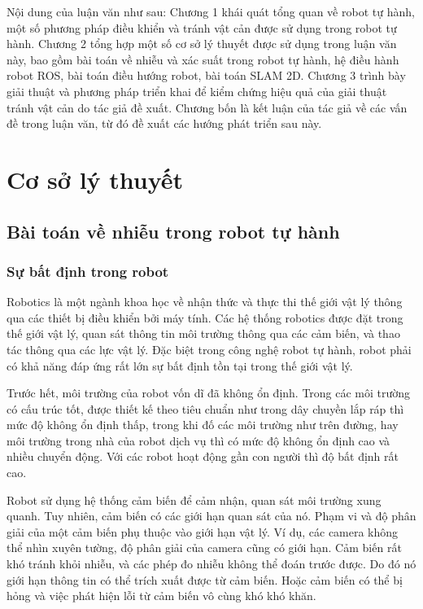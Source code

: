 Nội dung của luận văn như sau: Chương 1 khái quát tổng quan về robot tự hành, một số phương pháp điều khiển và tránh vật cản được sử dụng trong robot tự hành. Chương 2 tổng hợp một số cơ sở lý thuyết được sử dụng trong luận văn này, bao gồm bài toán về nhiễu và xác suất trong robot tự hành, hệ điều hành robot ROS, bài toán điều hướng robot, bài toán SLAM 2D. Chương 3 trình bày giải thuật và phương pháp triển khai để kiểm chứng hiệu quả của giải thuật tránh vật cản do tác giả đề xuất. Chương bốn là kết luận của tác giả về các vấn đề trong luận văn, từ đó đề xuất các hướng phát triển sau này.

\chapter{Cơ sở lý thuyết}
\label{chap:1cslt}
\section{Bài toán về nhiễu trong robot tự hành} \label{sec:2.1}
\subsection{Sự bất định trong robot}
Robotics là một ngành khoa học về nhận thức và thực thi thế giới vật lý thông qua các thiết bị điều khiển bởi máy tính. Các hệ thống robotics được đặt trong thế giới vật lý, quan sát thông tin môi trường thông qua các cảm biến, và thao tác thông qua các lực vật lý. Đặc biệt trong công nghệ robot tự hành, robot phải có khả năng đáp ứng rất lớn sự bất định tồn tại trong thế giới vật lý.

Trước hết, môi trường của robot vốn dĩ đã không ổn định. Trong các môi trường có cấu trúc tốt, được thiết kế theo tiêu chuẩn như trong dây chuyền lắp ráp thì mức độ không ổn định thấp, trong khi đố các môi trường như trên đường, hay môi trường trong nhà của robot dịch vụ thì có mức độ không ổn định cao và nhiều chuyển động. Với các robot hoạt động gần con người thì độ bất định rất cao.

Robot sử dụng hệ thống cảm biến để cảm nhận, quan sát môi trường xung quanh. Tuy nhiên, cảm biến có các giới hạn quan sát của nó. Phạm vi và độ phân giải của một cảm biến phụ thuộc vào giới hạn vật lý. Ví dụ, các camera không thể nhìn xuyên tường, độ phân giải của camera cũng có giới hạn. Cảm biến rất khó tránh khỏi nhiễu, và các phép đo nhiễu không thể đoán trước được. Do đó nó giới hạn thông tin có thể trích xuất được từ cảm biến. Hoặc cảm biến có thể bị hỏng và việc phát hiện lỗi từ cảm biến vô cùng khó khó khăn.

